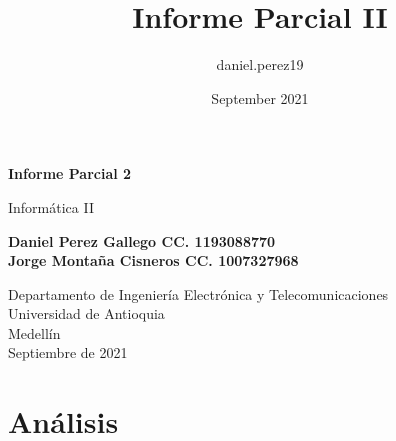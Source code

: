 \documentclass{article}
\title{Informe Parcial II}
\author{daniel.perez19 }
\date{September 2021}
\begin{document}
\begin{titlepage}
    \begin{center}
        \vspace*{1cm}
            
        \Huge
        \textbf{Informe Parcial 2}
            
        \vspace{0.5cm}
        \LARGE
        Informática II
            
        \vspace{1.5cm}
            
        \textbf{Daniel Perez Gallego CC. 1193088770\\Jorge Montaña Cisneros CC.  1007327968}
            
        \vfill
            
        \vspace{0.8cm}
            
        \Large
        Departamento de Ingeniería Electrónica y Telecomunicaciones\\
        Universidad de Antioquia\\
        Medellín\\
        Septiembre de 2021
            
    \end{center}
\end{titlepage}

\tableofcontents

\section{Análisis}
\end{document}

